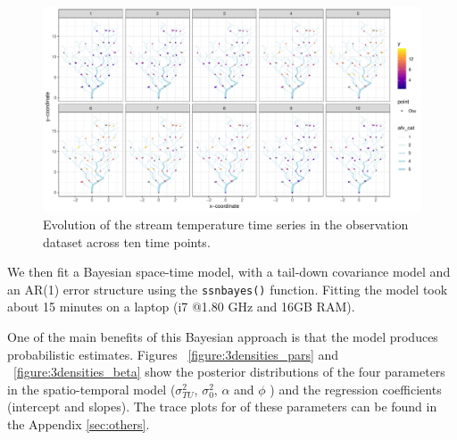 \begin{figure}[htbp]
  \centering
   \includegraphics[width=6.0in]{./Figs/2network_time_obs.pdf}
  \caption{Evolution of the stream temperature time series in the observation dataset across ten time points.}
  \label{figure:2network_time_obs}
\end{figure}


\pagebreak

We then fit a Bayesian space-time model, with a tail-down covariance model and an AR(1) error structure using the \texttt{ssnbayes()} function.
Fitting the model took about 15 minutes on a laptop (i7 @1.80 GHz and 16GB RAM).



One of the main benefits of this Bayesian approach is that the model produces probabilistic estimates.
Figures ~\ref{figure:3densities_pars} and  ~\ref{figure:3densities_beta} show the posterior distributions of the four parameters in the spatio-temporal model ($\sigma^2_{TU}$, $\sigma^2_{0}$, $\alpha$ and $\phi$ ) and the regression coefficients (intercept and slopes).  
The trace plots for of these parameters can be found in the Appendix \ref{sec:others}.



